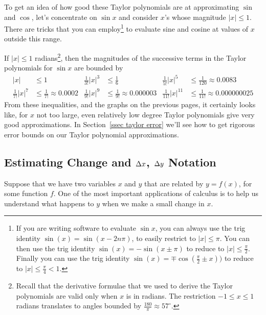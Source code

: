 \begin{eg}
\end{eg}

To get an idea of how good these Taylor polynomials are at approximating $\sin$ and
$\cos$, let's concentrate on $\sin x$ and consider $x$'s whose magnitude $|x|\le 1$.
There are tricks that you can employ\footnote{If you are writing software to evaluate
$\sin x$, you can always use the trig identity $\sin(x)=\sin(x-2n\pi)$, to  easily
restrict to $|x|\le\pi$. You can then use the trig identity $\sin(x)=-\sin(x\pm\pi)$ to
reduce to $|x|\le\tfrac{\pi}{2}$. Finally you can use the trig identity
$\sin(x)=\mp\cos(\tfrac{\pi}{2}\pm x))$ to reduce to $|x|\le\tfrac{\pi}{4} < 1$.} to
evaluate sine and cosine at values of $x$ outside this range.

If $|x|\le 1$ radians\footnote{Recall that the derivative formulae that we used to
derive the Taylor polynomials are valid only when $x$ is in radians. The
restriction $-1 \leq x \leq 1$ radians translates to angles bounded by
$\tfrac{180}{\pi}\approx 57^\circ$.}, then the magnitudes of the successive
terms in the Taylor polynomials for $\sin x$ are bounded by
\begin{align*}
|x|&\le 1 &
\tfrac{1}{3!}|x|^3&\le\tfrac{1}{6} &
\tfrac{1}{5!}|x|^5&\le\tfrac{1}{120}\approx 0.0083 \\
\tfrac{1}{7!}|x|^7&\le\tfrac{1}{7!}\approx 0.0002 &
\tfrac{1}{9!}|x|^9&\le\tfrac{1}{9!}\approx 0.000003 &
\tfrac{1}{11!}|x|^{11}&\le\tfrac{1}{11!}\approx 0.000000025
\end{align*}
From these inequalities, and the graphs on the previous pages, it certainly looks like,
for $x$ not too large, even relatively low degree Taylor polynomials give very good
approximations. In Section~\ref{ssec taylor error} we'll see how to get rigorous error
bounds on our Taylor polynomial approximations.




\subsection{Estimating Change and $\Delta x$, $\Delta y$ Notation}


Suppose that we have two variables $x$ and $y$ that are related by $y=f(x)$, for some
function $f$. One of the most important applications of calculus is to help us understand
what happens to $y$ when we make a small change in $x$.

